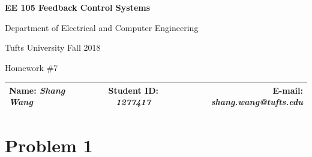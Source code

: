 \documentclass[a4paper]{article}
\begin{document}
\begin{center}
\bf\Large
EE 105 Feedback Control Systems\par
Department of Electrical and Computer Engineering\par
Tufts University Fall 2018\par
Homework \#7\par   
\end{center}
\begin{table}[H]
\begin{center}
\begin{tabular*}{\textwidth}{@{\extracolsep{\fill}}lcr}
Name: {\it Shang Wang} &Student ID: {\it 1277417} &E-mail: {\it shang.wang@tufts.edu}\\
\hline
\end{tabular*}
\end{center}
\end{table}

\section{Problem 1}
\end{document}
